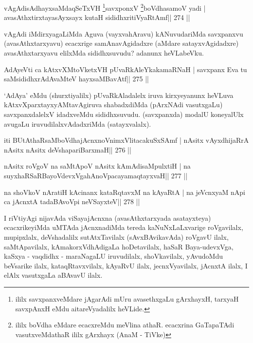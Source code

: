 \begin{shl}
vAgAdisAdhayxsaMdaqSeTxVH \footnote{ililx savxpanxveMdare jAgarAdi mUru avasethxgaLu  gArxhayxH, tarxyaH savxpAnxH eMdu aitareVyadalilx heVLide.}savxponxV \footnote{ililx boVdha eMdare ecacxreMdu meVlina athaR. ecacxrina GaTapaTAdi vasutxveMdathaR ililx gArxhayx (AnaM - TiVke)}boVdhasamoV yadi |
avasAthxtirxtayasAyxsayx kutaH sididhxritiVyaRtAmf\hfill || 274 ||
\end{shl}

\begin{artha}
vAgAdi iMdirxyagaLiMda Aguva (vayxvahAravu) kANuvudariMda savxpanxvu (avasAthxtarxyavu) ecacxrige samAnavAgidadxre (aMdare satayxvAgidadxre) avasAthxtarxyavu elilxMda sididhxsuvudu? adanunx heVLabeVku.
\end{artha}

\begin{shl}
AdAyeVti ca kAtxvXMtoVketxVH pUvaRkAleYkakamaRNaH |
savxpanx Eva tu saMsididhxrAdAvaMteV hayxsaMBavAtf\hfill || 275 ||
\end{shl}

\begin{artha}
`AdAya' eMdu (shurxtiyalilx) pUvaRkAladalelx iruva kirxyeyanunx heVLuva kAtxvXparxtayxyAMtavAgiruva shabadxdiMda (pArxNAdi vasutxgaLu) savxpanxdalelxV idadxveMdu sididhxsuvudu. (savxpanxda) modalU koneyalUlx avugaLu iruvudilalxvAdadxriMda (satayxvalalx).
\end{artha}


\begin{shl}
iti BUtAthaRsaMboVdhajAcnxnoVnimxVlitacakuSxSAmf |
nAsitx vAyxdhijaRrA nAsitx nAsitx deVshapariBarxmaH\hfill || 276 ||
\end{shl}

\begin{shl}
nAsitx roVgoV na saMtApoV nAsitx kAmAdisaMpulxtiH |
na suyxhaRSaRBayoVdevxVgahAnoVpacayamaqtayxvaH\hfill || 277 ||
\end{shl}

\begin{shl}
na shoVkoV nAratiH kAcinanx kataRqtavxM na kAyaRtA |
na jeVcnxyaM nApi ca jAcnxtA tadaBAvoV\s pi neVSayxteV\hfill || 278 ||
\end{shl}

\begin{artha}
I riVtiyAgi nijavAda viSayajAcnxna (avasAthxtarxyada asatayxteya) 
ecacxrikeyiMda uMTAda jAcnxnadiMda tereda kaNuNxLaLxvarige roVgavilalx, mupipxlalx, deVshadalilx sutAtxTavilalx (sAvxBAvikavAda) roVgavU ilalx, saMtApavilalx, kAmakorxVdhAdigaLa hoDetavilalx, haSaR Baya-udevxVga, kaSxya - vaqdidhx - maraNagaLU iruvudilalx, shoVkavilalx, yAvudoMdu beVsarike ilalx, kataqRtavxvilalx, kAyaRvU ilalx, jecnxVyavilalx, jAcnxtA ilalx, I elAlx vasutxgaLa aBAvavU ilalx.
\end{artha}

